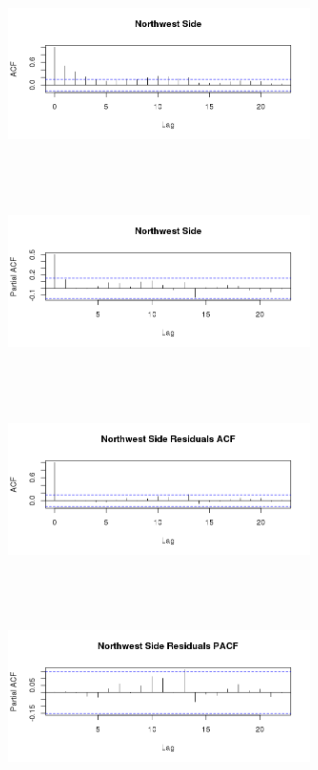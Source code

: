 \documentclass{article} %
\begin{document}
\begin{multicols}{2}
 \begin{figure}[H]
\includegraphics[height=50mm, width=80mm]{Plots/northwest_ACF.png}
\end{figure}
 
\begin{figure}[H]
\includegraphics[height=50mm, width=80mm]{Plots/northwest_PACF.png}
\end{figure}
 
\begin{figure}[H]
\includegraphics[height=50mm, width=80mm]{Plots/northwest_resid_ACF.png}
\end{figure}
 
\begin{figure}[H]
\includegraphics[height=50mm, width=80mm]{Plots/northwest_resid_PACF.png}
\end{figure}
 \end{multicols}
 
\end{document}
